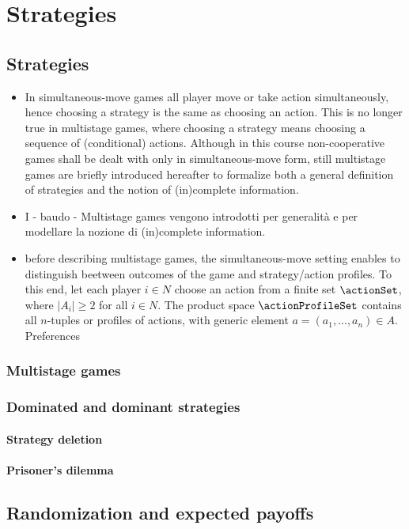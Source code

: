 \chapter{Strategies}
\section{Strategies}
\begin{itemize}
	\item In simultaneous-move games all player move or take action simultaneously, hence choosing a strategy is the same as choosing an action. This is no longer true in multistage games, where choosing a strategy means choosing a sequence of (conditional) actions. Although in this course non-cooperative games shall be dealt with only in simultaneous-move form, still multistage games are briefly introduced hereafter to formalize both a general definition of strategies and the notion of (in)complete information.
	\item I - baudo - Multistage games vengono introdotti per generalit\`a e per modellare la nozione di (in)complete information.
	\item before describing multistage games, the simultaneous-move setting enables to distinguish beetween outcomes of the game and strategy/action profiles. To this end, let each player $i \in N$ choose an action from a finite set $\actionSet$, where $|A_i| \ge 2$ for all $i \in N$. The product space $\actionProfileSet$ contains all $n$-tuples or profiles of actions, with generic element $a = (a_1, ..., a_n) \in A$. Preferences  
\end{itemize}


\subsection{Multistage games}
\subsection{Dominated and dominant strategies}
\subsubsection{Strategy deletion}
\subsubsection{Prisoner's dilemma}

\section{Randomization and expected payoffs}
